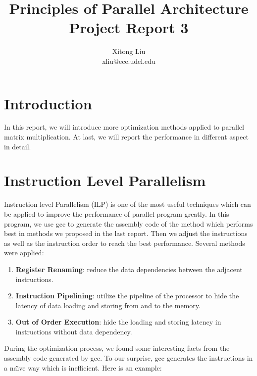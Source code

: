 \documentclass[12pt]{article}
\title{Principles of Parallel Architecture\\
Project Report 3}
\author{Xitong Liu \\
xliu@ece.udel.edu}
\begin{document}
\maketitle

\section{Introduction}
In this report, we will introduce more optimization methods applied
to parallel matrix multiplication. At last, we will report the 
performance in different aspect in detail.

\section{Instruction Level Parallelism}
Instruction level Parallelism (ILP) is one of the most useful techniques 
which can be applied to improve the performance of parallel program 
greatly. In this program, we use gcc to generate the assembly code of 
the method which performs best in methods we proposed in the last 
report. Then we adjust the instructions as well as the instruction 
order to reach the best performance. Several methods were applied:

\begin{enumerate}
\item \textbf{Register Renaming}: reduce the data dependencies between 
the adjacent instructions.
\item \textbf{Instruction Pipelining}: utilize the pipeline of the 
processor to hide the latency of data loading and storing from and to 
the memory.
\item \textbf{Out of Order Execution}: hide the loading and storing 
latency in instructions without data dependency.
\end{enumerate}

During the optimization process, we found some interesting facts from
the assembly code generated by gcc. To our surprise, gcc generates the
instructions in a na\"\i ve way which is inefficient. Here is an example:
\end{document}
